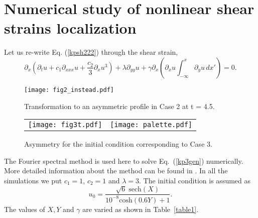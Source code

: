 \section{Numerical study of nonlinear shear strains localization}
Let us re-write Eq. (\ref{kpsh222}) through the shear strain, 
\begin{equation}
	\label{kp3gen}
	\partial_x\left(\partial_t u+c_1 \partial_{xxx} u+\frac{c_2 }{3}\partial_x u^{3}\right)+\lambda \partial_{yy} u+\gamma \partial_x\left(\partial_x u \int_{-\infty}^x \partial_y u \, dx'\right)=0.
\end{equation}
\begin{figure}
	\begin{center}
		\texttt{[image: fig2\_instead.pdf]} 
		\caption{Transformation to an asymmetric profile in Case 2 at t = 4.5.}\label{fig2}
	\end{center}
\end{figure}
\begin{figure}
	\begin{center}
		\begin{tabular}{cc}
			\texttt{[image: fig3t.pdf]} & \texttt{[image: palette.pdf]}
		\end{tabular}
		\caption{Asymmetry for the initial condition corresponding to Case 3.}\label{fig3}
	\end{center}
\end{figure}
The Fourier spectral method is used here to solve Eq.~(\ref{kp3gen}) numerically. More detailed information about the method can be found in \cite{poosan20}.
In all the simulations we put $c_1 = 1$, $c_2 = 1$ and $\lambda = 3$. The initial condition is assumed as
\begin{equation}\label{init}
	u_0 = \frac{\sqrt{6}\;\mathrm{sech}(X)}{10^{-8} \mathrm
		{cosh} (0.6 Y)+1}.
\end{equation}
The values of $X, Y$ and $\gamma$ are varied as shown in Table~\ref{table1}.


